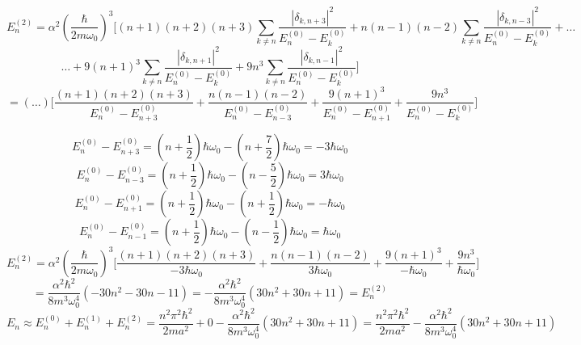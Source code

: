 \documentclass[11pt]{article}
\def\h{\hbar}
\def\w{\omega}
\def\sp{\vspace{3mm}}
\theoremstyle{pink}
\theoremstyle{boxedsolution}
\theoremstyle{definition}
\theoremstyle{claim}
\begin{document}
\newpage
\[E_n^{(2)}=\alpha^2\left(\frac{\h}{2m\w_0}\right)^{3}\Bigg[
(n+1)(n+2)(n+3)\sum_{k\neq n}\frac{|\delta_{k,n+3}|^2}{E^{(0)}_n-E^{(0)}_k} 
+ n(n-1)(n-2)\sum_{k\neq n}\frac{|\delta_{k,n-3}|^2}{E^{(0)}_n-E^{(0)}_k} + \dots
\]
\sp
\[\dots +9(n+1)^3\sum_{k\neq n}\frac{|\delta_{k,n+1}|^2}{E^{(0)}_n-E^{(0)}_k}
+ 9n^3\sum_{k\neq n}\frac{|\delta_{k,n-1}|^2}{E^{(0)}_n-E^{(0)}_k}\Bigg]
\]
\sp
\[=(\dots)\Bigg[
\frac{(n+1)(n+2)(n+3)}{E^{(0)}_n-E^{(0)}_{n+3}} 
+ \frac{n(n-1)(n-2)}{E^{(0)}_n-E^{(0)}_{n-3}}
+\frac{9(n+1)^3}{E^{(0)}_n-E^{(0)}_{n+1}}
+\frac{9n^3}{E^{(0)}_n-E^{(0)}_k}\Bigg]\]

\sp
\[E^{(0)}_{n}-E^{(0)}_{n+3}=\left(n+\frac{1}{2}\right)\h\w_0-\left(n+\frac{7}{2}\right)\h\w_0=-3\h\w_0\]
\sp
\[E^{(0)}_{n}-E^{(0)}_{n-3}=\left(n+\frac{1}{2}\right)\h\w_0-\left(n-\frac{5}{2}\right)\h\w_0=3\h\w_0\]
\sp
\[E^{(0)}_{n}-E^{(0)}_{n+1}=\left(n+\frac{1}{2}\right)\h\w_0-\left(n+\frac{1}{2}\right)\h\w_0=-\h\w_0\]
\sp
\[E^{(0)}_{n}-E^{(0)}_{n-1}=\left(n+\frac{1}{2}\right)\h\w_0-\left(n-\frac{1}{2}\right)\h\w_0=\h\w_0\]
\sp
\[E^{(2)}_n=\alpha^2\left(\frac{\h}{2m\w_0}\right)^{3}\Bigg[
\frac{(n+1)(n+2)(n+3)}{-3\h\w_0} 
+ \frac{n(n-1)(n-2)}{3\h\w_0}
+\frac{9(n+1)^3}{-\h\w_0}
+\frac{9n^3}{\h\w_0}\Bigg]\]
\sp
\[=\frac{\alpha^2\h^2}{8m^3\w_0^4}(-30n^2-30n-11)=-\frac{\alpha^2\h^2}{8m^3\w_0^4}(30n^2+30n+11)=E^{(2)}_n\]
\sp
\[E_n\approx E_n^{(0)}+E_n^{(1)}+E_n^{(2)}=\frac{n^2\pi^2\h^2}{2ma^2}+0-\frac{\alpha^2\h^2}{8m^3\w_0^4}(30n^2+30n+11)=\frac{n^2\pi^2\h^2}{2ma^2}-\frac{\alpha^2\h^2}{8m^3\w_0^4}(30n^2+30n+11)\]
\end{document}
